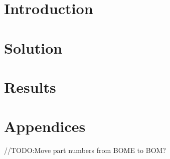 \documentclass[abstract=on]{scrreprt}
\begin{document}
\newcommand{\vthreek}{V.E.C.T.O.R. -3000 }





\setcounter{page}{1}

\tableofcontents

\newpage

\setcounter{page}{1}

\part{Introduction}




\part{Solution}








\part{Results}





\glsaddall
\printglossaries

\listoffigures

\listoftables

\printbibliography

\part{Appendices}
\begin{appendices}
//TODO:Move part numbers from BOME to BOM?







\end{appendices}
\end{document}
